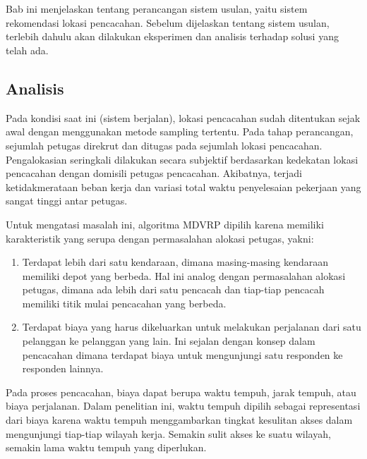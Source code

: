 \chapter{\babEmpat}


Bab ini menjelaskan tentang perancangan sistem usulan, yaitu sistem rekomendasi lokasi pencacahan. Sebelum dijelaskan tentang sistem usulan, terlebih dahulu akan dilakukan eksperimen dan analisis terhadap solusi yang telah ada.


\section{Analisis}
\label{sec:analysis}
Pada kondisi saat ini (sistem berjalan), lokasi pencacahan sudah ditentukan sejak awal dengan menggunakan metode sampling tertentu. Pada tahap perancangan, sejumlah petugas direkrut dan ditugas pada sejumlah lokasi pencacahan. Pengalokasian seringkali dilakukan secara subjektif berdasarkan kedekatan lokasi pencacahan dengan domisili petugas pencacahan. Akibatnya, terjadi ketidakmerataan beban kerja dan variasi total waktu penyelesaian pekerjaan yang sangat tinggi antar petugas. 

Untuk mengatasi masalah ini, algoritma MDVRP dipilih karena memiliki karakteristik yang serupa dengan permasalahan alokasi petugas, yakni: 

\begin{enumerate}
	\item Terdapat lebih dari satu kendaraan, dimana masing-masing kendaraan memiliki depot yang berbeda. Hal ini analog dengan permasalahan alokasi petugas, dimana ada lebih dari satu pencacah dan tiap-tiap pencacah memiliki titik mulai pencacahan yang berbeda. 
	\item Terdapat biaya yang harus dikeluarkan untuk melakukan perjalanan dari satu pelanggan ke pelanggan yang lain. Ini sejalan dengan konsep dalam pencacahan dimana terdapat biaya untuk mengunjungi satu responden ke responden lainnya. 
\end{enumerate}

Pada proses pencacahan, biaya dapat berupa waktu tempuh, jarak tempuh, atau biaya perjalanan. Dalam penelitian ini, waktu tempuh dipilih sebagai representasi dari biaya karena waktu tempuh menggambarkan tingkat kesulitan akses dalam mengunjungi tiap-tiap wilayah kerja. Semakin sulit akses ke suatu wilayah, semakin lama waktu tempuh yang diperlukan. 

